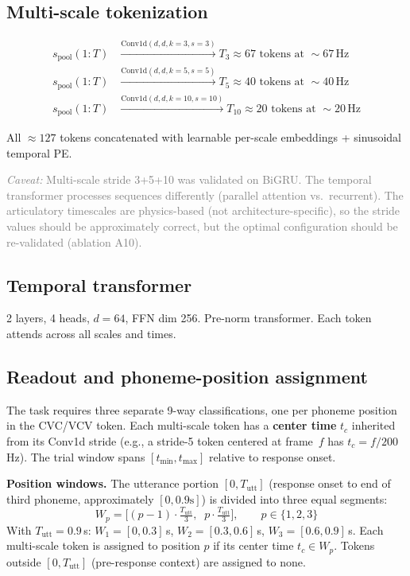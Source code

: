 \documentclass[11pt,letterpaper]{article}
\newcommand{\caveat}[1]{\par\smallskip\noindent\textcolor{gray}{\textit{Caveat:} #1}\smallskip}
\begin{document}
\subsection{Multi-scale tokenization}

\begin{equation}
\begin{aligned}
s_{\text{pool}}(1{:}T) &\xrightarrow{\text{Conv1d}(d,d,k{=}3,s{=}3)} T_3 \approx 67 \text{ tokens at } {\sim}67\,\text{Hz}\\
s_{\text{pool}}(1{:}T) &\xrightarrow{\text{Conv1d}(d,d,k{=}5,s{=}5)} T_5 \approx 40 \text{ tokens at } {\sim}40\,\text{Hz}\\
s_{\text{pool}}(1{:}T) &\xrightarrow{\text{Conv1d}(d,d,k{=}10,s{=}10)} T_{10} \approx 20 \text{ tokens at } {\sim}20\,\text{Hz}
\end{aligned}
\end{equation}

All ${\approx}127$ tokens concatenated with learnable per-scale embeddings + sinusoidal temporal PE.

\caveat{Multi-scale stride 3+5+10 was validated on BiGRU. The temporal transformer processes sequences differently (parallel attention vs.\ recurrent). The articulatory timescales are physics-based (not architecture-specific), so the stride values should be approximately correct, but the optimal configuration should be re-validated (ablation A10).}

\subsection{Temporal transformer}

2 layers, 4 heads, $d{=}64$, FFN dim 256. Pre-norm transformer. Each token attends across all scales and times.

\subsection{Readout and phoneme-position assignment}\label{sec:readout-temporal}

The task requires three separate 9-way classifications, one per phoneme position in the CVC/VCV token. Each multi-scale token has a \textbf{center time} $t_c$ inherited from its Conv1d stride (e.g., a stride-5 token centered at frame~$f$ has $t_c = f / 200$\,Hz). The trial window spans $[t_{\min}, t_{\max}]$ relative to response onset.

\textbf{Position windows.} The utterance portion $[0, T_{\text{utt}}]$ (response onset to end of third phoneme, approximately $[0, 0.9\text{s}]$) is divided into three equal segments:
\begin{equation}
W_p = \bigl[(p{-}1) \cdot \tfrac{T_{\text{utt}}}{3},\;\; p \cdot \tfrac{T_{\text{utt}}}{3}\bigr], \qquad p \in \{1, 2, 3\}
\end{equation}
With $T_{\text{utt}} = 0.9$\,s: $W_1 = [0, 0.3]$\,s, $W_2 = [0.3, 0.6]$\,s, $W_3 = [0.6, 0.9]$\,s. Each multi-scale token is assigned to position $p$ if its center time $t_c \in W_p$. Tokens outside $[0, T_{\text{utt}}]$ (pre-response context) are assigned to none.
\end{document}
